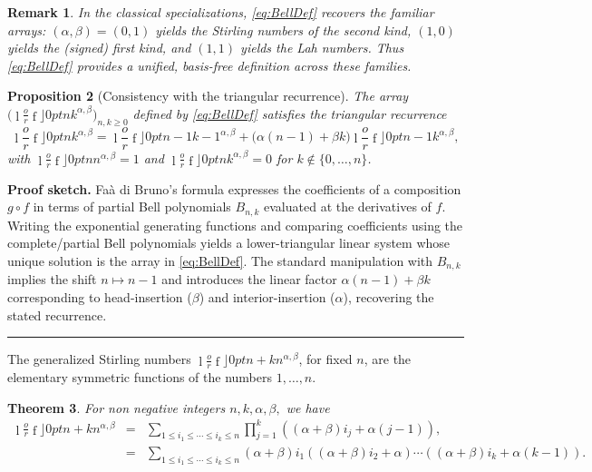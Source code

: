 \documentclass{article}
\newcommand {\lah}[2]{\genfrac\lfloor \rfloor{0pt}{}{#1}{#2}}
\newtheorem{theorem}{Theorem}
\newtheorem{proposition}[theorem]{Proposition}
\newtheorem{remark}[theorem]{Remark}
\newenvironment{proof}[1][Proof]{\noindent\textbf{#1.} }{\ \rule{0.5em}{0.5em}}
\begin{document}
\begin{remark}
In the classical specializations, \eqref{eq:BellDef} recovers the familiar arrays:
$(\alpha,\beta)=(0,1)$ yields the Stirling numbers of the second kind, $(1,0)$ yields the (signed) first kind, and $(1,1)$ yields the Lah numbers. Thus \eqref{eq:BellDef} provides a unified, basis-free definition across these families.
\end{remark}

\begin{proposition}[Consistency with the triangular recurrence]
The array $\big(\lah{n}{k}^{\alpha,\beta}\big)_{n,k\ge 0}$ defined by \eqref{eq:BellDef} satisfies the triangular recurrence
\[
\lah{n}{k}^{\alpha ,\beta }=\lah{n-1}{k-1}^{\alpha ,\beta }+\big(\alpha (n-1)+\beta k\big)\lah{n-1}{k}^{\alpha ,\beta },
\]
with $\lah{n}{n}^{\alpha ,\beta }=1$ and $\lah{n}{k}^{\alpha ,\beta }=0$ for $k\notin\{0,\ldots,n\}$.
\end{proposition}

\begin{proof}[Proof sketch]
Fa\`a di Bruno's formula expresses the coefficients of a composition $g\!\circ f$ in terms of partial Bell polynomials $B_{n,k}$ evaluated at the derivatives of $f$. Writing the exponential generating functions and comparing coefficients using the complete/partial Bell polynomials yields a lower-triangular linear system whose unique solution is the array in \eqref{eq:BellDef}. The standard manipulation with $B_{n,k}$ implies the shift $n\mapsto n-1$ and introduces the linear factor $\alpha(n-1)+\beta k$ corresponding to head-insertion ($\beta$) and interior-insertion ($\alpha$), recovering the stated recurrence.
\end{proof}

The generalized Stirling numbers $\lah{n+k}{n}^{\alpha
,\beta }$, for fixed $n$, are the elementary symmetric functions of the
numbers $1,\ldots ,n$.

\begin{theorem}
For non negative integers $n,k,\alpha ,\beta ,$ we have%
\begin{eqnarray*}
\lah{n+k}{n}^{\alpha ,\beta } &=&\sum_{1\leqslant
i_{1}\leqslant \cdots \leqslant i_{k}\leqslant
n}\prod\limits_{j=1}^{k}\left( \left( \alpha +\beta \right) i_{j}+\alpha
\left( j-1\right) \right) , \\
&=&\sum_{1\leqslant i_{1}\leqslant \cdots \leqslant i_{k}\leqslant n}\left(
\alpha +\beta \right) i_{1}\left( \left( \alpha +\beta \right) i_{2}+\alpha
\right) \cdots \left( \left( \alpha +\beta \right) i_{k}+\alpha \left(
k-1\right) \right) .
\end{eqnarray*}
\end{theorem}
\end{document}
